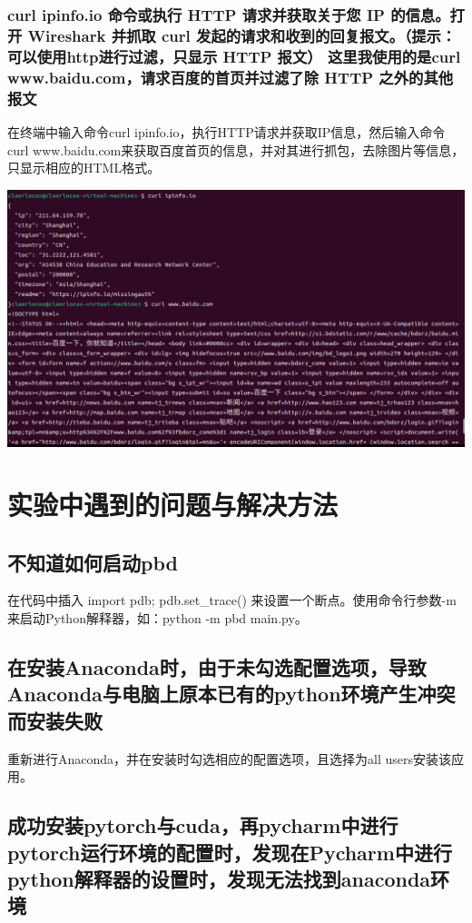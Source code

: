 \documentclass[UTF8,a4paper]{ctexart}
\begin{document}
\begin{sloppypar}
	\subsubsection{curl ipinfo.io 命令或执行 HTTP 请求并获取关于您 IP 的信息。打开 Wireshark 并抓取 curl 发起的请求和收到的回复报文。（提示：可以使用http进行过滤，只显示 HTTP 报文） 这里我使用的是curl www.baidu.com，请求百度的首页并过滤了除 HTTP 之外的其他报文}
	
	在终端中输入命令curl ipinfo.io，执行HTTP请求并获取IP信息，然后输入命令curl www.baidu.com来获取百度首页的信息，并对其进行抓包，去除图片等信息，只显示相应的HTML格式。

	\includegraphics[width = 16cm]{12}

	
	\section{实验中遇到的问题与解决方法}
	\subsection{不知道如何启动pbd}

	在代码中插入 import pdb; pdb.set\_trace() 来设置一个断点。使用命令行参数-m来启动Python解释器，如：python -m pbd main.py。
	
	\subsection{在安装Anaconda时，由于未勾选配置选项，导致Anaconda与电脑上原本已有的python环境产生冲突而安装失败}
	
	重新进行Anaconda，并在安装时勾选相应的配置选项，且选择为all users安装该应用。

	\subsection{成功安装pytorch与cuda，再pycharm中进行pytorch运行环境的配置时，发现在Pycharm中进行python解释器的设置时，发现无法找到anaconda环境}
	

\end{sloppypar}
\end{document}
